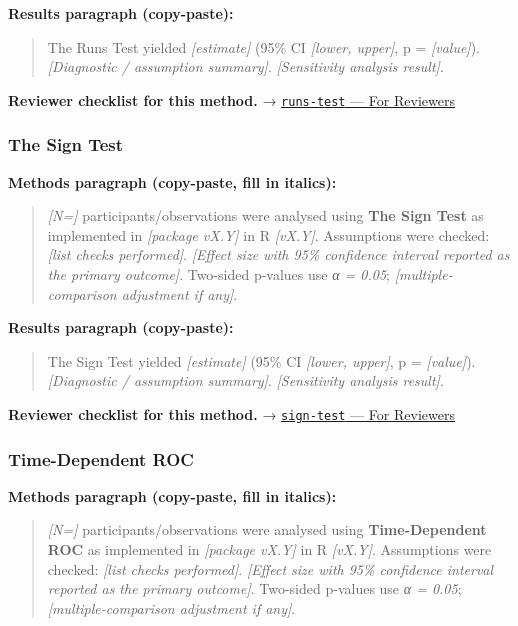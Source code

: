 \documentclass[
]{article}
\begin{document}
\textbf{Results paragraph (copy-paste):}

\begin{quote}
The Runs Test yielded \emph{{[}estimate{]}} (95\% CI \emph{{[}lower,
upper{]}}, p = \emph{{[}value{]}}). \emph{{[}Diagnostic / assumption
summary{]}}. \emph{{[}Sensitivity analysis result{]}}.
\end{quote}

\textbf{Reviewer checklist for this method.} →
\href{../chapters/04-inferential/runs-test.Rmd\#for-reviewers}{\texttt{runs-test}
--- For Reviewers}

\subsubsection{The Sign Test}\label{the-sign-test}

\textbf{Methods paragraph (copy-paste, fill in italics):}

\begin{quote}
\emph{{[}N={]}} participants/observations were analysed using
\textbf{The Sign Test} as implemented in \emph{{[}package vX.Y{]}} in R
\emph{{[}vX.Y{]}}. Assumptions were checked: \emph{{[}list checks
performed{]}}. \emph{{[}Effect size with 95\% confidence interval
reported as the primary outcome{]}}. Two-sided p-values use \emph{α =
0.05}; \emph{{[}multiple-comparison adjustment if any{]}}.
\end{quote}

\textbf{Results paragraph (copy-paste):}

\begin{quote}
The Sign Test yielded \emph{{[}estimate{]}} (95\% CI \emph{{[}lower,
upper{]}}, p = \emph{{[}value{]}}). \emph{{[}Diagnostic / assumption
summary{]}}. \emph{{[}Sensitivity analysis result{]}}.
\end{quote}

\textbf{Reviewer checklist for this method.} →
\href{../chapters/04-inferential/sign-test.Rmd\#for-reviewers}{\texttt{sign-test}
--- For Reviewers}

\subsubsection{Time-Dependent ROC}\label{time-dependent-roc}

\textbf{Methods paragraph (copy-paste, fill in italics):}

\begin{quote}
\emph{{[}N={]}} participants/observations were analysed using
\textbf{Time-Dependent ROC} as implemented in \emph{{[}package vX.Y{]}}
in R \emph{{[}vX.Y{]}}. Assumptions were checked: \emph{{[}list checks
performed{]}}. \emph{{[}Effect size with 95\% confidence interval
reported as the primary outcome{]}}. Two-sided p-values use \emph{α =
0.05}; \emph{{[}multiple-comparison adjustment if any{]}}.
\end{quote}
\end{document}
